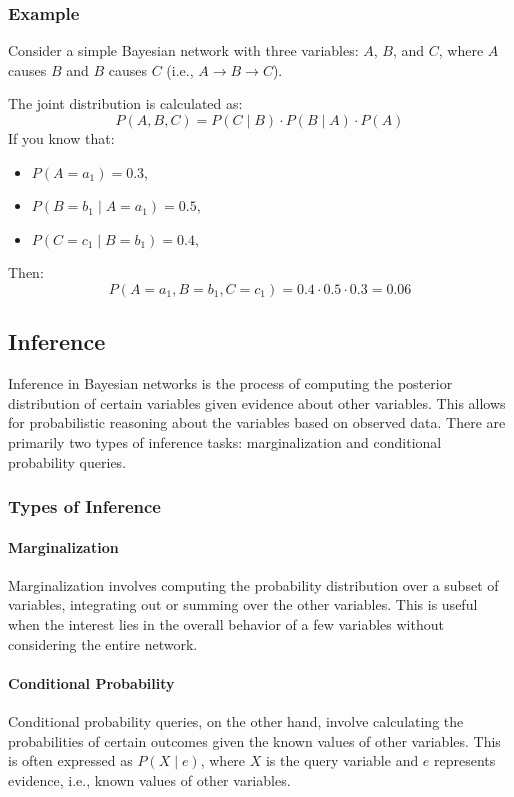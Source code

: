 \subsubsection{Example}
Consider a simple Bayesian network with three variables: $A$, $B$, and $C$, where $A$ causes $B$ and $B$ causes $C$ (i.e., $A \rightarrow B \rightarrow C$).

The joint distribution is calculated as:
\[
P(A, B, C) = P(C \mid B) \cdot P(B \mid A) \cdot P(A)
\]
If you know that:
\begin{itemize}
    \item $P(A = a_1) = 0.3$,
    \item $P(B = b_1 \mid A = a_1) = 0.5$,
    \item $P(C = c_1 \mid B = b_1) = 0.4$,
\end{itemize}
Then:
\[
P(A = a_1, B = b_1, C = c_1) = 0.4 \cdot 0.5 \cdot 0.3 = 0.06
\]

\subsection{Inference}
Inference in Bayesian networks is the process of computing the posterior distribution of certain variables given evidence about other variables. This allows for probabilistic reasoning about the variables based on observed data. There are primarily two types of inference tasks: marginalization and conditional probability queries.

\subsubsection{Types of Inference}
\paragraph{Marginalization}
Marginalization involves computing the probability distribution over a subset of variables, integrating out or summing over the other variables. This is useful when the interest lies in the overall behavior of a few variables without considering the entire network.

\paragraph{Conditional Probability}
Conditional probability queries, on the other hand, involve calculating the probabilities of certain outcomes given the known values of other variables. This is often expressed as \( P(X \mid e) \), where \( X \) is the query variable and \( e \) represents evidence, i.e., known values of other variables.

